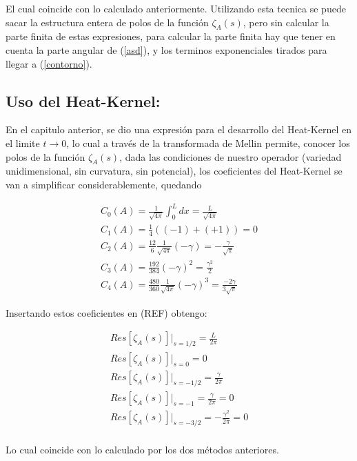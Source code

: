 El cual coincide con lo calculado anteriormente. Utilizando esta tecnica se puede sacar la estructura entera de polos de la función $\zeta _A (s) $, pero sin calcular la parte finita de estas expresiones, para calcular la parte finita hay que tener en cuenta la parte angular de (\ref{asd}), y los terminos exponenciales tirados para llegar a (\ref{contorno}).


\subsection{Uso del Heat-Kernel:}

En el capitulo anterior, se dio una expresión para el desarrollo del Heat-Kernel en el limite $t \rightarrow 0$, lo cual a través de la transformada de Mellin permite, conocer los polos de la función $\zeta _A (s)$, dada las condiciones de nuestro operador (variedad unidimensional, sin curvatura, sin potencial), los coeficientes del Heat-Kernel se van a simplificar considerablemente, quedando

\begin{equation}
\begin{array}{c}
C _0 (A) = \frac{1}{\sqrt{4 \pi}} \int _{0} ^{L} dx = \frac{L}{\sqrt{4 \pi}} \\
C _1 (A) = \frac{1}{4} \left( (-1) + (+1) \right) = 0 \\
C _2 (A) = \frac{12}{6} \frac{1}{\sqrt{4 \pi }} \left(  - \gamma \right) = - \frac{\gamma}{\sqrt{\pi}} \\
C _3 (A) = \frac{192}{384}  (- \gamma ) ^2 = \frac{\gamma ^2}{2} \\
C _4 (A) = \frac{480}{360} \frac{1}{\sqrt{4 \pi}} (- \gamma) ^3 = \frac{-2 \gamma}{3 \sqrt{\pi}}

\end{array}
\end{equation}

Insertando estos coeficientes en (REF) obtengo:

\begin{equation}
\begin{array}{c}
Res[ \zeta _A (s)] | _{s=1/2} = \frac{L}{2 \pi} \\
Res[ \zeta _A (s)] | _{s=0} = 0 \\
Res[ \zeta _A (s)] | _{s=-1/2} = \frac{\gamma}{2 \pi} \\
Res[ \zeta _A (s)] | _{s=-1} = \frac{\gamma}{2 \pi} = 0 \\
Res[ \zeta _A (s)] | _{s=-3/2} = - \frac{\gamma ^2}{2 \pi} = 0 \\


\end{array}
\end{equation}

Lo cual coincide con lo calculado por los dos métodos anteriores.
